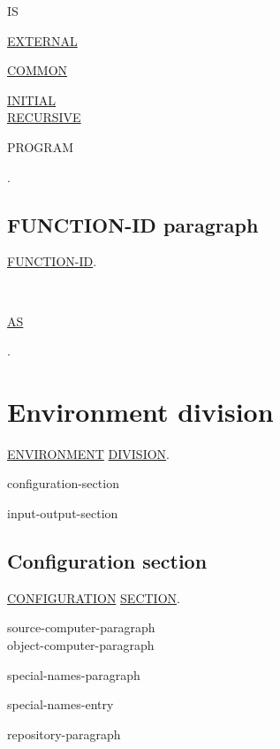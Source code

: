 \documentclass[a4paper,oneside,svgnames]{scrbook}
\makeatletter
\newcommand{\key}[1]{\underline{#1}}
\newcommand{\miscext}[1]{%
  \colorbox{blue!50}{#1}}
\newenvironment{0-1}{$\left[ \begin{tabular}{@{}l@{}}}{\end{tabular} \right]$}
\newenvironment{0+}{$\left[\left| \begin{tabular}{@{}l@{}}}{\end{tabular} \right|\right]$}
\newenvironment{1=}{$\left\{ \begin{tabular}{@{}l@{}}}{\end{tabular} \right\}$}
\newenvironment{1+}{$\left\{\left| \begin{tabular}{@{}l@{}}}{\end{tabular} \right|\right\}$}
\makeatother
\begin{document}
\begin{0-1} IS
  \begin{1=}
    \miscext{\key{EXTERNAL}} \\

    \begin{1+}
      \key{COMMON} \\

      \begin{1=}
        \key{INITIAL} \\
        \key{RECURSIVE}
      \end{1=}
    \end{1+}
  \end{1=}
  PROGRAM
\end{0-1}.

\section{FUNCTION-ID paragraph}

\key{FUNCTION-ID}.
\begin{1=}
  \functionname \\
  \literal
\end{1=}
\begin{0-1} \key{AS} \literal \end{0-1}.

\chapter{Environment division}
\begin{0-1}
  \key{ENVIRONMENT} \key{DIVISION}.
\end{0-1}
\newline
\begin{0-1}
  configuration-section
\end{0-1}
\newline
\begin{0-1}
  input-output-section
\end{0-1}

\section{Configuration section}

\begin{0-1}
  \key{CONFIGURATION} \key{SECTION}.
\end{0-1}
\newline
\begin{0+}
  source-computer-paragraph \\
  object-computer-paragraph
\end{0+}
\newline
\begin{0-1}
  special-names-paragraph
\end{0-1}
\newline
\begin{0-1}
  special-names-entry
\end{0-1}
\newline
\begin{0-1}
  repository-paragraph
\end{0-1}
\end{document}
